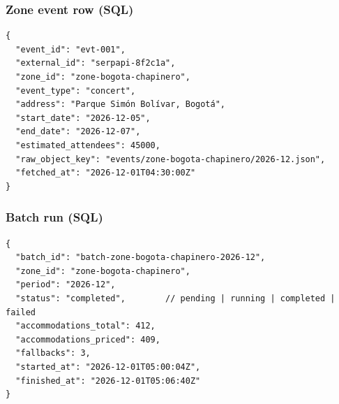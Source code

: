 \documentclass[11pt,a4paper]{article}
\begin{document}
\subsubsection{Zone event row (SQL)}
\begin{lstlisting}
{
  "event_id": "evt-001",
  "external_id": "serpapi-8f2c1a",
  "zone_id": "zone-bogota-chapinero",
  "event_type": "concert",
  "address": "Parque Simón Bolívar, Bogotá",
  "start_date": "2026-12-05",
  "end_date": "2026-12-07",
  "estimated_attendees": 45000,
  "raw_object_key": "events/zone-bogota-chapinero/2026-12.json",
  "fetched_at": "2026-12-01T04:30:00Z"
}
\end{lstlisting}

\subsubsection{Batch run (SQL)}
\begin{lstlisting}
{
  "batch_id": "batch-zone-bogota-chapinero-2026-12",
  "zone_id": "zone-bogota-chapinero",
  "period": "2026-12",
  "status": "completed",        // pending | running | completed | failed
  "accommodations_total": 412,
  "accommodations_priced": 409,
  "fallbacks": 3,
  "started_at": "2026-12-01T05:00:04Z",
  "finished_at": "2026-12-01T05:06:40Z"
}
\end{lstlisting}
\end{document}
